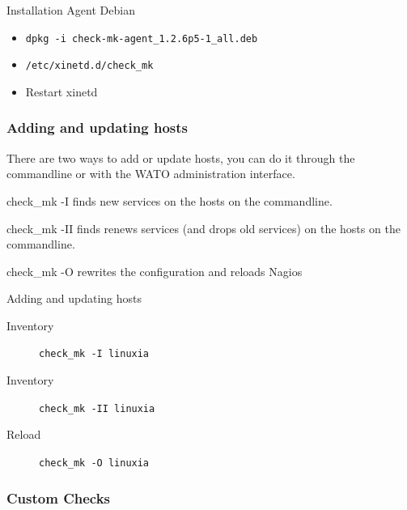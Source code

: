 \begin{frame}[fragile]{Installation Agent Debian}
\begin{itemize}
\item\verb|dpkg -i check-mk-agent_1.2.6p5-1_all.deb|
\item \verb|/etc/xinetd.d/check_mk|
\item Restart xinetd 
\end{itemize}
\end{frame}

\subsubsection{Adding and updating hosts}
There are two ways to add or update hosts, you can do
it through the commandline or with the WATO administration
interface.

check\_mk -I finds new services on the hosts on the commandline.

check\_mk -II finds renews services (and drops old services) 
on the hosts on the commandline.

check\_mk -O rewrites the configuration and reloads Nagios

\begin{frame}[fragile]{Adding and updating hosts}
\begin{description}
\item[Inventory] \verb|check_mk -I linuxia|
\item[Inventory] \verb|check_mk -II linuxia|
\item[Reload] \verb|check_mk -O linuxia|
\end{description}
\end{frame}




\subsubsection{Custom Checks}

